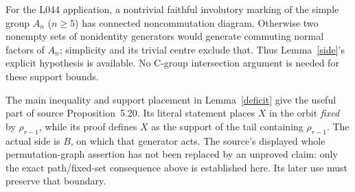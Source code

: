 \documentclass[11pt,a4paper]{article}
\begin{document}
For the L044 application, a nontrivial faithful involutory marking
of the simple group $A_n$ ($n\ge5$) has connected noncommutation
diagram. Otherwise two nonempty sets of nonidentity generators
would generate commuting normal factors of $A_n$; simplicity and
its trivial centre exclude that. Thus Lemma~\ref{side}'s explicit
hypothesis is available. No C-group intersection argument is
needed for these support bounds.

The main inequality and support placement in
Lemma~\ref{deficit} give the useful part of source
Proposition~5.20. Its literal statement places $X$ in the orbit
\emph{fixed} by $\rho_{r-1}$, while its proof defines $X$ as the
support of the tail containing $\rho_{r-1}$. The actual side is
$B$, on which that generator acts. The source's displayed
whole permutation-graph assertion has not been replaced by an
unproved claim: only the exact path/fixed-set consequence above
is established here. Its later use must preserve that boundary.
\end{document}
